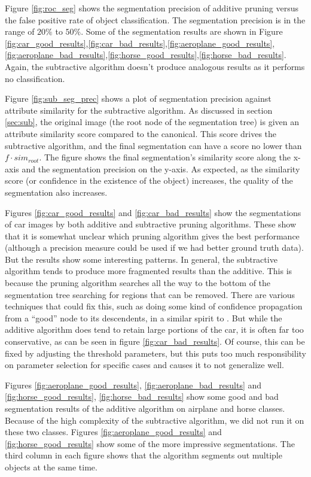 \documentclass[10pt,twocolumn,letterpaper]{article}
\begin{document}
Figure \ref{fig:roc_seg} shows the segmentation precision of additive pruning 
versus the false positive rate of object classification. The segmentation precision
is in the range of $20\%$ to $50\%$. Some of the segmentation results are shown in 
Figure \ref{fig:car_good_results},\ref{fig:car_bad_results},\ref{fig:aeroplane_good_results},\ref{fig:aeroplane_bad_results},\ref{fig:horse_good_results},\ref{fig:horse_bad_results}.  Again, the subtractive algorithm doesn't produce
analogous results as it performs no classification.

Figure \ref{fig:sub_seg_prec} shows a plot of segmentation precision against 
attribute similarity for the subtractive algorithm.  As discussed in section 
\ref{sec:sub}, the original image (the root node of the segmentation tree)
is given an attribute similarity score compared to the canonical.  This score
drives the subtractive algorithm, and the final segmentation can have a score
no lower than $f\cdot sim_{root}$.  The figure shows the final segmentation's
similarity score along the x-axis and the segmentation precision on the y-axis.
As expected, as the similarity score (or confidence in the existence of the
object) increases, the quality of the segmentation also increases.

Figures \ref{fig:car_good_results} and \ref{fig:car_bad_results} show the
segmentations of car images by both additive and subtractive pruning
algorithms. These show that it is somewhat unclear which pruning algorithm
gives the best performance (although a precision measure could be used if we
had better ground truth data).  But the results show some interesting patterns.
In general, the subtractive algorithm tends to produce more fragmented results
than the additive.  This is because the pruning algorithm searches all the way
to the bottom of the segmentation tree searching for regions that can be removed.
There are various techniques that could fix this, such as doing some kind of
confidence propagation from a ``good'' node to its descendents, in a similar
spirit to \cite{borenstein04}.  But while the additive algorithm does tend
to retain large portions of the car, it is often far too conservative, as
can be seen in figure \ref{fig:car_bad_results}.  Of course, this can be 
fixed by adjusting the threshold parameters, but this puts too much responsibility
on parameter selection for specific cases and causes it to not generalize well.

Figures \ref{fig:aeroplane_good_results}, \ref{fig:aeroplane_bad_results} and 
\ref{fig:horse_good_results}, \ref{fig:horse_bad_results} show some good and bad 
segmentation results of the additive algorithm on airplane and horse classes. Because of the
high complexity of the subtractive algorithm, we did not run it on these two classes. 
Figures \ref{fig:aeroplane_good_results} and \ref{fig:horse_good_results} show some
of the more impressive segmentations.  The third column in each figure shows that
the algorithm segments out multiple objects at the same time.
\end{document}
